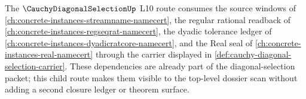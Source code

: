 The $\CauchyDiagonalSelectionUp$ L10 route consumes the source windows of \autoref{ch:concrete-instances-streamname-namecert}, the regular rational readback of \autoref{ch:concrete-instances-regseqrat-namecert}, the dyadic tolerance ledger of \autoref{ch:concrete-instances-dyadicratcore-namecert}, and the Real seal of \autoref{ch:concrete-instances-real-namecert} through the carrier displayed in \autoref{def:cauchy-diagonal-selection-carrier}. These dependencies are already part of the diagonal-selection packet; this child route makes them visible to the top-level dossier scan without adding a second closure ledger or theorem surface.
